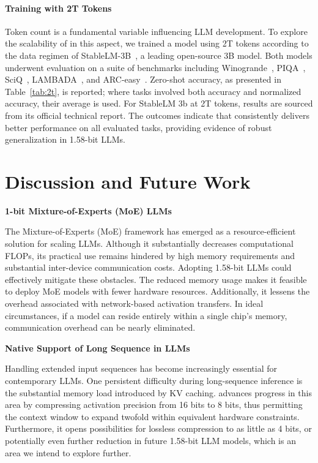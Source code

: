 \paragraph{Training with 2T Tokens}

Token count is a fundamental variable influencing LLM development. To explore the scalability of  in this aspect, we trained a  model using 2T tokens according to the data regimen of StableLM-3B~\cite{StableLM-3B-4E1T}, a leading open-source 3B model. Both models underwent evaluation on a suite of benchmarks including Winogrande~\cite{winoGrande}, PIQA~\cite{piqa}, SciQ~\cite{sciq}, LAMBADA~\cite{lambada}, and ARC-easy~\cite{arc}. Zero-shot accuracy, as presented in Table~\ref{tab:2t}, is reported; where tasks involved both accuracy and normalized accuracy, their average is used. For StableLM 3b at 2T tokens, results are sourced from its official technical report. The outcomes indicate that  consistently delivers better performance on all evaluated tasks, providing evidence of robust generalization in 1.58-bit LLMs.

\section{Discussion and Future Work}

\textbf{1-bit Mixture-of-Experts (MoE) LLMs}

The Mixture-of-Experts (MoE) framework has emerged as a resource-efficient solution for scaling LLMs. Although it substantially decreases computational FLOPs, its practical use remains hindered by high memory requirements and substantial inter-device communication costs. Adopting 1.58-bit LLMs could effectively mitigate these obstacles. The reduced memory usage makes it feasible to deploy MoE models with fewer hardware resources. Additionally, it lessens the overhead associated with network-based activation transfers. In ideal circumstances, if a model can reside entirely within a single chip’s memory, communication overhead can be nearly eliminated.

\textbf{Native Support of Long Sequence in LLMs}

Handling extended input sequences has become increasingly essential for contemporary LLMs. One persistent difficulty during long-sequence inference is the substantial memory load introduced by KV caching.  advances progress in this area by compressing activation precision from 16 bits to 8 bits, thus permitting the context window to expand twofold within equivalent hardware constraints. Furthermore, it opens possibilities for lossless compression to as little as 4 bits, or potentially even further reduction in future 1.58-bit LLM models, which is an area we intend to explore further.

